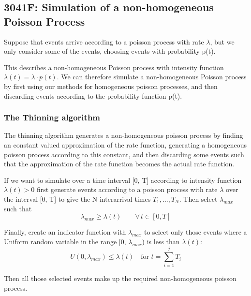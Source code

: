 \subsection{3041F: Simulation of a non-homogeneous Poisson Process}
Suppose that events arrive according to a poisson process with rate
\(\lambda\), but we only consider some of the events, choosing events with
probability p(t).\newline \newline

This describes a non-homogeneous Poisson process with intensity function
\(\lambda(t) = \lambda \cdot p(t)\).  We can therefore simulate a
non-homogeneous Poisson process by first using our methods for homogeneous
poisson processes, and then discarding events according to the probability
function p(t).  \newline \newline

\subsubsection{The Thinning algorithm}
The thinning algorithm generates a non-homogeneous poisson process by finding an constant valued 
approximation of the rate function, generating a homogeneous poisson process according to this 
constant, and then discarding some events such that the approximation of the rate function 
becomes the actual rate function.

If we want to simulate over a time interval [0, T] according to intensity function 
\(\lambda(t) > 0\) first generate events according to a poisson process with rate \(\lambda\)
over the interval [0, T] to give the N interarrival times \(T_1, \dots, T_N\).\newline
Then select \(\lambda_{max}\) such that 
\begin{equation*}
    \lambda_{max} \ge \lambda(t) \qquad \forall \, t \in [0, T]
\end{equation*}

Finally, create an indicator function with \(\lambda_{max}\) to select only those events where
a Uniform random variable in the range [0, \(\lambda_{max}\)) is less than \(\lambda(t)\): 
\begin{equation*}
    U(0, \lambda_{max}) \le \lambda(t) \quad \text{for } t = \sum_{i=1}^{j} T_i
\end{equation*}

Then all those selected events make up the required non-homogeneous poisson process.
